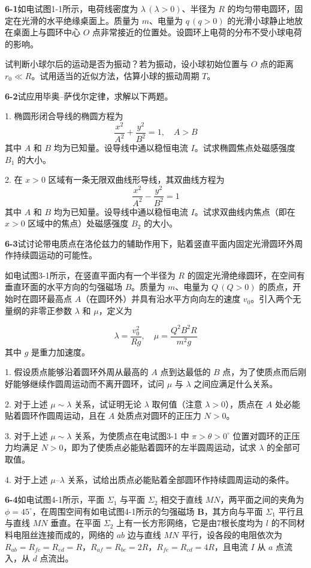 \newpage
\textbf{6-1}\quad 如电试图1-1所示，电荷线密度为 $\lambda\,(\lambda > 0)$、半径为 $R$ 的均匀带电圆环，固定在光滑的水平绝缘桌面上。质量为 $m$、电量为 $q\,(q > 0)$ 的光滑小球静止地放在桌面上与圆环中心 $O$ 点非常接近的位置处。设圆环上电荷的分布不受小球电荷的影响。


试判断小球尔后的运动是否为振动？若为振动，设小球初始位置与 $O$ 点的距离 $r_{0} \ll R$。试用适当的近似方法，估算小球的振动周期 $T$。
\vfill

\textbf{6-2}\quad 试应用毕奥--萨伐尔定律，求解以下两题。

1. 椭圆形闭合导线的椭圆方程为
$$
\frac{x^{2}}{A^{2}} + \frac{y^{2}}{B^{2}} = 1, \quad A > B
$$
其中 $A$ 和 $B$ 均为已知量。设导线中通以稳恒电流 $I$。试求椭圆焦点处磁感强度 $B_{1}$ 的大小。

2. 在 $x > 0$ 区域有一条无限双曲线形导线，其双曲线方程为
$$
\frac{x^{2}}{A^{2}} - \frac{y^{2}}{B^{2}} = 1
$$
其中 $A$ 和 $B$ 均为已知量。设导线中通以稳恒电流 $I$。试求双曲线内焦点（即在 $x > 0$ 区域中的焦点）处磁感强度 $B_{2}$ 的大小。
\vfill

\newpage
\textbf{6-3}\quad 试讨论带电质点在洛伦兹力的辅助作用下，贴着竖直平面内固定光滑圆环外周作持续圆运动的可能性。

如电试图3-1所示，在竖直平面内有一个半径为 $R$ 的固定光滑绝缘圆环，在空间有垂直环面的水平方向的匀强磁场 $B$。质量为 $m$、电量为 $Q\,(Q > 0)$ 的质点，开始时在圆环最高点 $A$（在圆环外）并具有沿水平方向向左的速度 $v_{0}$。引入两个无量纲的非零正参数 $\lambda$ 和 $\mu$，定义为


$$
\lambda = \frac{v_{0}^{2}}{Rg}, \quad \mu = \frac{Q^{2}B^{2}R}{m^{2}g}
$$
其中 $g$ 是重力加速度。

1. 假设质点能够沿着圆环外周从最高的 $A$ 点到达最低的 $B$ 点，为了使质点而后刚好能够继续作圆周运动而不离开圆环，试问 $\mu$ 与 $\lambda$ 之间应满足什么关系。

2. 对于上述 $\mu \sim \lambda$ 关系，试证明无论 $\lambda$ 取何值（注意 $\lambda > 0$），质点在 $A$ 处必能贴着圆环作圆周运动，且在 $A$ 处质点对圆环的正压力 $N > 0$。

3. 对于上述 $\mu \sim \lambda$ 关系，为使质点在电试图3-1 中 $\pi > \theta > 0^{\circ}$ 位置对圆环的正压力均满足 $N > 0$，即为了使质点必能贴着圆环的左半圆周运动，试求 $\lambda$ 的全部可取值。

4. 对于上述 $\mu$--$\lambda$ 关系，试给出质点必能贴着全部圆环作持续圆周运动的条件。
\vfill

\textbf{6-4}\quad 如电试图4-1所示，平面 $\Sigma_{1}$ 与平面 $\Sigma_{2}$ 相交于直线 $MN$，两平面之间的夹角为 $\phi = 45^{\circ}$，在周围空间有如电试图4-1所示的匀强磁场 $\boldsymbol{B}$，其方向与平面 $\Sigma_{1}$ 平行且与直线 $MN$ 垂直。在平面 $\Sigma_{2}$ 上有一长方形网络，它是由7根长度均为 $l$ 的不同材料电阻丝连接而成的，网络的 $ab$ 边与直线 $MN$ 平行，设各段的电阻依次为 $R_{ab} = R_{fc} = R_{ed} = R$，$R_{af} = R_{bc} = 2R$，$R_{fe} = R_{cd} = 4R$，且电流 $I$ 从 $a$ 点流入，从 $d$ 点流出。


